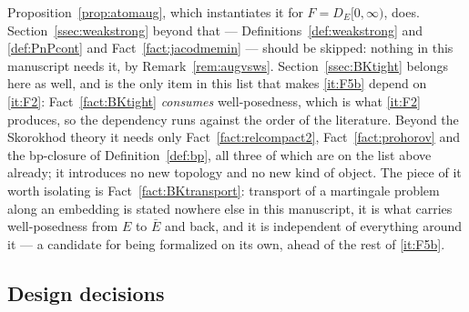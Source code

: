 \documentclass[11pt,a4paper]{article}
\theoremstyle{plain}
\theoremstyle{definition}
\theoremstyle{remark}
\newcommand{\DE}{D_E[0,\infty)}
\begin{document}
\begin{enumerate}[label=\textbf{(F\arabic*)}]
  Proposition~\ref{prop:atomaug}, which instantiates it for $F = \DE$, does.
  Section~\ref{ssec:weakstrong} beyond that --- Definitions~\ref{def:weakstrong}
  and \ref{def:PnPcont} and Fact~\ref{fact:jacodmemin} --- should be skipped:
  nothing in this manuscript needs it, by Remark~\ref{rem:augvsws}.
  Section~\ref{ssec:BKtight} belongs here as well, and is the only item in this
  list that makes \ref{it:F5b} depend on \ref{it:F2}: Fact~\ref{fact:BKtight}
  \emph{consumes} well-posedness, which is what \ref{it:F2} produces, so the
  dependency runs against the order of the literature.  Beyond the Skorokhod
  theory it needs only Fact~\ref{fact:relcompact2}, Fact~\ref{fact:prohorov} and
  the bp-closure of Definition~\ref{def:bp}, all three of which are on the list
  above already; it introduces no new topology and no new kind of object.  The
  piece of it worth isolating is Fact~\ref{fact:BKtransport}: transport of a
  martingale problem along an embedding is stated nowhere else in this manuscript,
  it is what carries well-posedness from $E$ to $\bar E$ and back, and it is
  independent of everything around it --- a candidate for being formalized on its
  own, ahead of the rest of \ref{it:F5b}.
\end{enumerate}

\subsection{Design decisions}
\end{document}
